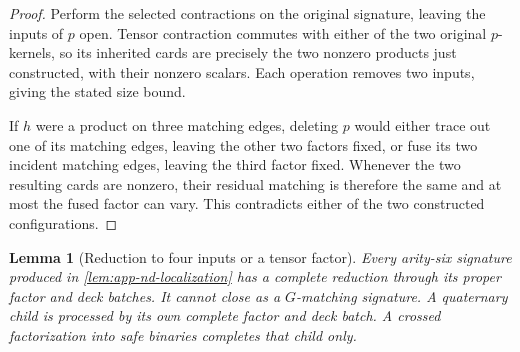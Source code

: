 \documentclass[11pt,letterpaper,onecolumn]{article}
\theoremstyle{plain}
\newtheorem{lemma}[lemma]{Lemma}
\theoremstyle{definition}
\theoremstyle{remark}
\begin{document}
\begin{proof}
Perform the selected contractions on the original signature, leaving the
inputs of \(p\) open.  Tensor contraction commutes with either of the two
original \(p\)-kernels, so its inherited cards are precisely the two
nonzero products just constructed, with their nonzero scalars.
Each operation removes two inputs, giving the stated size bound.

If \(h\) were a product on three matching edges, deleting \(p\) would
either trace out one of its matching edges, leaving the other two factors
fixed, or fuse its two incident matching edges, leaving the third factor
fixed.  Whenever the two resulting cards are nonzero, their residual
matching is therefore the same and at most the fused factor can vary.
This contradicts either of the two constructed configurations.
\end{proof}

\begin{lemma}[Reduction to four inputs or a tensor factor]
\label{lem:app-nd-bounded-consumer}
Every arity-six signature produced in \cref{lem:app-nd-localization} has a complete
reduction through its proper factor and deck batches.  It cannot
close as a \(G\)-matching signature.  A quaternary child is processed
by its own complete factor and deck batch. A crossed factorization into safe binaries
completes that child only.
\end{lemma}
\end{document}
